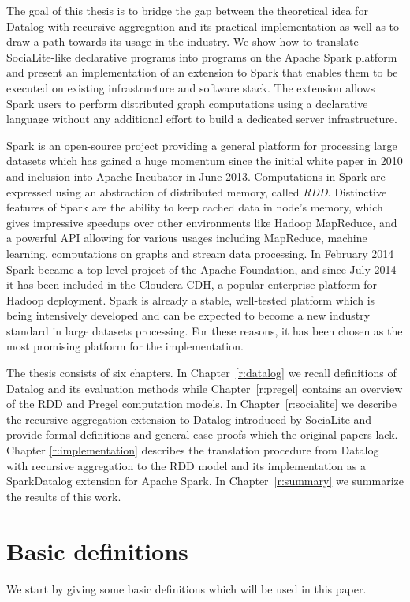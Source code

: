 The goal of this thesis is to bridge the gap between the theoretical idea for Datalog with recursive aggregation and its practical implementation as well as to draw a path towards its usage in the industry. We show how to translate SociaLite-like declarative programs into programs on the Apache Spark platform and present an implementation of an extension to Spark that enables them to be executed on existing infrastructure and software stack. The extension allows Spark users to perform distributed graph computations using a declarative language without any additional effort to build a dedicated server infrastructure.

Spark \cite{spark2} is an open-source project providing a general platform for processing large datasets which has gained a huge momentum since the initial white paper in 2010 \cite{spark} and inclusion into Apache Incubator in June 2013. Computations in Spark are expressed using an abstraction of distributed memory, called \emph{RDD}. Distinctive features of Spark are the ability to keep cached data in node's memory, which gives impressive speedups over other environments like Hadoop MapReduce, and a powerful API allowing for various usages including MapReduce, machine learning, computations on graphs and stream data processing. In February 2014 Spark became a top-level project of the Apache Foundation, and since July 2014 it has been included in the Cloudera CDH, a popular enterprise platform for Hadoop deployment. Spark is already a stable, well-tested platform which is being intensively developed and can be expected to become a new industry standard in large datasets processing. For these reasons, it has been chosen as the most promising platform for the implementation.

The thesis consists of six chapters. In Chapter~\ref{r:datalog} we recall definitions of Datalog and its evaluation methods while Chapter~\ref{r:pregel} contains an overview of the RDD and Pregel computation models. In Chapter~\ref{r:socialite} we describe the recursive aggregation extension to Datalog introduced by SociaLite and provide formal definitions and general-case proofs which the original papers lack. Chapter \ref{r:implementation} describes the translation procedure from Datalog with recursive aggregation to the RDD model and its implementation as a SparkDatalog extension for Apache Spark. In Chapter~\ref{r:summary} we summarize the results of this work.

\section{Basic definitions}\label{r:basicdefs}
We start by giving some basic definitions which will be used in this paper.

